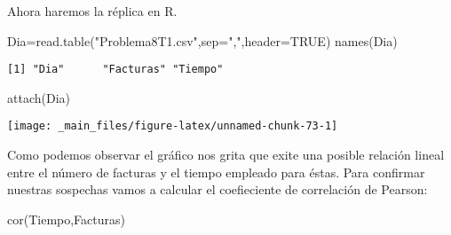 \documentclass[
  a4paper,
  oneside,
  openany]{book}
\newenvironment{Shaded}{\begin{snugshade}}{\end{snugshade}}
\newcommand{\AttributeTok}[1]{\textcolor[rgb]{0.77,0.63,0.00}{#1}}
\newcommand{\ConstantTok}[1]{\textcolor[rgb]{0.00,0.00,0.00}{#1}}
\newcommand{\DecValTok}[1]{\textcolor[rgb]{0.00,0.00,0.81}{#1}}
\newcommand{\FunctionTok}[1]{\textcolor[rgb]{0.00,0.00,0.00}{#1}}
\newcommand{\NormalTok}[1]{#1}
\newcommand{\OtherTok}[1]{\textcolor[rgb]{0.56,0.35,0.01}{#1}}
\newcommand{\SpecialCharTok}[1]{\textcolor[rgb]{0.00,0.00,0.00}{#1}}
\newcommand{\StringTok}[1]{\textcolor[rgb]{0.31,0.60,0.02}{#1}}
\begin{document}
Ahora haremos la réplica en R.

\begin{Shaded}
\begin{Highlighting}[]
\NormalTok{Dia}\OtherTok{=}\FunctionTok{read.table}\NormalTok{(}\StringTok{"Problema8T1.csv"}\NormalTok{,}\AttributeTok{sep=}\StringTok{","}\NormalTok{,}\AttributeTok{header=}\ConstantTok{TRUE}\NormalTok{)}
\FunctionTok{names}\NormalTok{(Dia)}
\end{Highlighting}
\end{Shaded}

\begin{verbatim}
[1] "Dia"      "Facturas" "Tiempo"  
\end{verbatim}

\begin{Shaded}
\begin{Highlighting}[]
\FunctionTok{attach}\NormalTok{(Dia)}
\end{Highlighting}
\end{Shaded}

\begin{Shaded}
\end{Shaded}

\begin{center}\texttt{[image: \_main\_files/figure-latex/unnamed-chunk-73-1]} \end{center}

Como podemos observar el gráfico nos grita que exite una posible relación lineal entre el número de facturas y el tiempo empleado para éstas.
Para confirmar nuestras sospechas vamos a calcular el coefieciente de correlación de Pearson:

\begin{Shaded}
\begin{Highlighting}[]
\FunctionTok{cor}\NormalTok{(Tiempo,Facturas)}
\end{Highlighting}
\end{Shaded}
\end{document}
